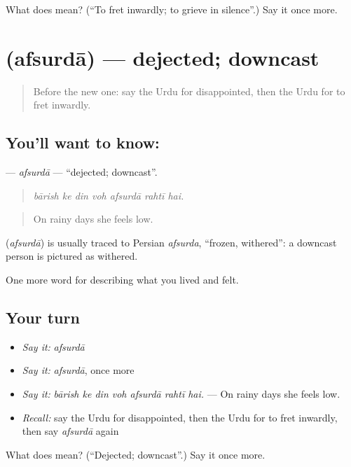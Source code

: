 \begin{tcolorbox}[breakable,colback=teal!4,colframe=teal!35!black,title={Before you move on}]
What does  mean? (\textquotedblleft{}To fret inwardly; to grieve in silence\textquotedblright{}.) Say it once more.
\end{tcolorbox}
\section[\texorpdfstring{\ur{افسردہ} (afsurdā)}{افسردہ (afsurdā)}]{ (afsurdā) — dejected; downcast}

\label{lesson:UR-C443-afsurda}



\begin{quote}
Before the new one: say the Urdu for disappointed, then the Urdu for to fret inwardly.
\end{quote}

\subsection*{You'll want to know: }
\textbf{} — \emph{afsurdā} — \textquotedblleft{}dejected; downcast\textquotedblright{}.

\begin{quote}
      
\end{quote}

\begin{quote}
\emph{bārish ke din voh afsurdā rahtī hai.}
\end{quote}

\begin{quote}
On rainy days she feels low.
\end{quote}

\begin{cousinweb}
\textbf{} (\emph{afsurdā}) is usually traced to Persian \emph{afsurda}, \textquotedblleft{}frozen, withered\textquotedblright{}: a downcast person is pictured as withered.
\end{cousinweb}

\begin{grammarlens}[title={What you've built}]
One more word for describing what you lived and felt.
\end{grammarlens}

\subsection*{Your turn}
\begin{itemize}
\raggedright
  \item \emph{Say it:} \emph{afsurdā}
  \item \emph{Say it:} \emph{afsurdā}, once more
  \item \emph{Say it:} \emph{bārish ke din voh afsurdā rahtī hai.} — On rainy days she feels low.
  \item \emph{Recall:} say the Urdu for disappointed, then the Urdu for to fret inwardly, then say \emph{afsurdā} again
\end{itemize}

\begin{tcolorbox}[breakable,colback=teal!4,colframe=teal!35!black,title={Before you move on}]
What does  mean? (\textquotedblleft{}Dejected; downcast\textquotedblright{}.) Say it once more.
\end{tcolorbox}
